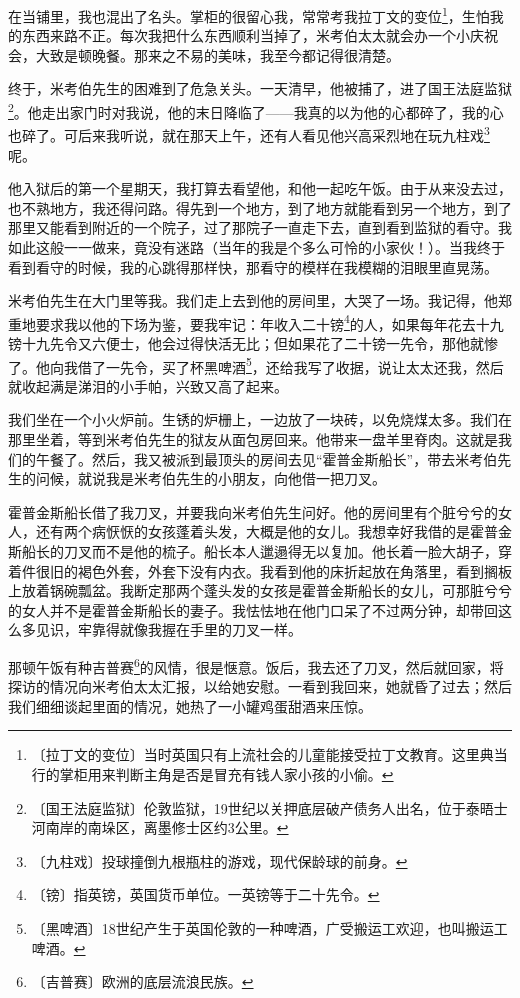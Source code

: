 \documentclass[12pt,UTF-8,openany]{ctexbook}
\begin{document}
\begin{large}
    在当铺里，我也混出了名头。掌柜的很留心我，常常考我拉丁文的变位\footnote{〔拉丁文的变位〕当时英国只有上流社会的儿童能接受拉丁文教育。这里典当行的掌柜用来判断主角是否是冒充有钱人家小孩的小偷。}，生怕我的东西来路不正。每次我把什么东西顺利当掉了，米考伯太太就会办一个小庆祝会，大致是顿晚餐。那来之不易的美味，我至今都记得很清楚。
    
    终于，米考伯先生的困难到了危急关头。一天清早，他被捕了，进了国王法庭监狱\footnote{〔国王法庭监狱〕伦敦监狱，19世纪以关押底层破产债务人出名，位于泰晤士河南岸的南垛区，离墨修士区约3公里。}。他走出家门时对我说，他的末日降临了——我真的以为他的心都碎了，我的心也碎了。可后来我听说，就在那天上午，还有人看见他兴高采烈地在玩九柱戏\footnote{〔九柱戏〕投球撞倒九根瓶柱的游戏，现代保龄球的前身。}呢。
    
    他入狱后的第一个星期天，我打算去看望他，和他一起吃午饭。由于从来没去过，也不熟地方，我还得问路。得先到一个地方，到了地方就能看到另一个地方，到了那里又能看到附近的一个院子，过了那院子一直走下去，直到看到监狱的看守。我如此这般一一做来，竟没有迷路（当年的我是个多么可怜的小家伙！）。当我终于看到看守的时候，我的心跳得那样快，那看守的模样在我模糊的泪眼里直晃荡。
    
    米考伯先生在大门里等我。我们走上去到他的房间里，大哭了一场。我记得，他郑重地要求我以他的下场为鉴，要我牢记：年收入二十镑\footnote{〔镑〕指英镑，英国货币单位。一英镑等于二十先令。}的人，如果每年花去十九镑十九先令又六便士，他会过得快活无比；但如果花了二十镑一先令，那他就惨了。他向我借了一先令，买了杯黑啤酒\footnote{〔黑啤酒〕18世纪产生于英国伦敦的一种啤酒，广受搬运工欢迎，也叫搬运工啤酒。}，还给我写了收据，说让太太还我，然后就收起满是涕泪的小手帕，兴致又高了起来。
    
    我们坐在一个小火炉前。生锈的炉栅上，一边放了一块砖，以免烧煤太多。我们在那里坐着，等到米考伯先生的狱友从面包房回来。他带来一盘羊里脊肉。这就是我们的午餐了。然后，我又被派到最顶头的房间去见“霍普金斯船长”，带去米考伯先生的问候，就说我是米考伯先生的小朋友，向他借一把刀叉。
    
    霍普金斯船长借了我刀叉，并要我向米考伯先生问好。他的房间里有个脏兮兮的女人，还有两个病恹恹的女孩蓬着头发，大概是他的女儿。我想幸好我借的是霍普金斯船长的刀叉而不是他的梳子。船长本人邋遢得无以复加。他长着一脸大胡子，穿着件很旧的褐色外套，外套下没有内衣。我看到他的床折起放在角落里，看到搁板上放着锅碗瓢盆。我断定那两个蓬头发的女孩是霍普金斯船长的女儿，可那脏兮兮的女人并不是霍普金斯船长的妻子。我怯怯地在他门口呆了不过两分钟，却带回这么多见识，牢靠得就像我握在手里的刀叉一样。
    
    那顿午饭有种吉普赛\footnote{〔吉普赛〕欧洲的底层流浪民族。}的风情，很是惬意。饭后，我去还了刀叉，然后就回家，将探访的情况向米考伯太太汇报，以给她安慰。一看到我回来，她就昏了过去；然后我们细细谈起里面的情况，她热了一小罐鸡蛋甜酒来压惊。
    

\end{large}
\end{document}
